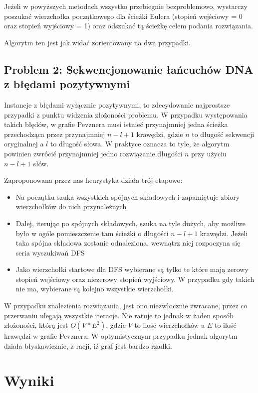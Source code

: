 \documentclass[a4paper]{article}
\begin{document}
Jeżeli w powyższych metodach wszystko przebiegnie bezproblemowo, wystarczy poszukać wierzchołka początkowego dla ścieżki
Eulera (stopień wejściowy = 0 oraz stopień wyjściowy = 1) oraz odszukać tą ścieżkę celem podania rozwiązania.

Algorytm ten jest jak widać zorientowany na dwa przypadki. %

\subsection{Problem 2: Sekwencjonowanie łańcuchów DNA z błędami pozytywnymi}
Instancje z błędami wyłącznie pozytywnymi, to zdecydowanie najprostsze przypadki z punktu widzenia złożoności problemu.
W przypadku występowania takich błędów, w grafie Pevznera musi istnieć przynajmniej jedna ścieżka przechodząca przez
przynajmniej $n-l+1$ krawędzi, gdzie $n$ to długość sekwencji oryginalnej a $l$ to długość słowa. W praktyce oznacza to tyle,
że algorytm powinien zwrócić przynajmniej jedno rozwiązanie długości $n$ przy użyciu $n-l+1$ słów.

Zaproponowana przez nas heurystyka działa trój-etapowo:
\begin{itemize}
\item Na początku szuka wszystkich spójnych składowych i zapamiętuje zbiory wierzchołków do nich przynależnych
\item Dalej, iterując po spójnych składowych, szuka na tyle dużych, aby możliwe było w ogóle pomieszczenie tam ścieżki
o długości $n-l+1$ krawędzi. Jeżeli taka spójna składowa zostanie odnaleziona, wewnątrz niej rozpoczyna się seria
wyszukiwań DFS
\item Jako wierzchołki startowe dla DFS wybierane są tylko te które mają zerowy stopień wejściowy oraz niezerowy
stopień wyjściowy. W przypadku gdy takich nie ma, wybierane są kolejno wszystkie wierzchołki.
\end{itemize}

W przypadku znalezienia rozwiązania, jest ono niezwłocznie zwracane, przez co przerwaniu ulegają wszystkie iteracje.
Nie ratuje to jednak w żaden sposób złożoności, którą jest $O(V*E^2)$, gdzie $V$ to ilość wierzchołków a $E$ to ilość
krawędzi w grafie Pevznera. W optymistycznym przypadku jednak algorytm działa błyskawicznie, z racji, iż graf jest
bardzo rzadki.

\section{Wyniki}
\end{document}
